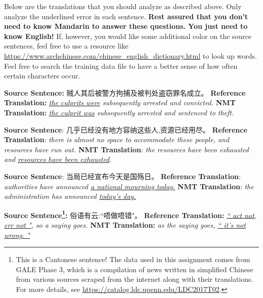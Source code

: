 \begin{parts}
    Below are the translations that you should analyze as described above. Only analyze the underlined error in each sentence. {\bf Rest assured that you don't need to know Mandarin to answer these questions. You just need to know English!} If, however, you would like some additional color on the source sentences, feel free to use a resource like \url{https://www.archchinese.com/chinese_english_dictionary.html} to look up words. Feel free to search the training data file to have a better sense of how often certain characters occur.

    \begin{subparts}
        \subpart[2]
        \textbf{Source Sentence:} 贼人其后被警方拘捕及被判处盗窃罪名成立。 \newline
        \textbf{Reference Translation:} \textit{\underline{the culprits were} subsequently arrested and convicted.}\newline
        \textbf{NMT Translation:} \textit{\underline{the culprit was} subsequently arrested and sentenced to theft.}
        
        \ifans{}


        \subpart[2]
        \textbf{Source Sentence}: 几乎已经没有地方容纳这些人,资源已经用尽。\newline
        \textbf{Reference Translation}: \textit{there is almost no space to accommodate these people, and resources have run out.   }\newline
        \textbf{NMT Translation}: \textit{the resources have been exhausted and \underline{resources have been exhausted}.}
        
        \ifans{}

        \subpart[2]
        \textbf{Source Sentence}: 当局已经宣布今天是国殇日。 \newline
        \textbf{Reference Translation}: \textit{authorities have announced \underline{a national mourning today.}}\newline
        \textbf{NMT Translation}: \textit{the administration has announced \underline{today's day.}}
        
        \ifans{}
        
        \subpart[2] 
        \textbf{Source Sentence\footnote{This is a Cantonese sentence! The data used in this assignment comes from GALE Phase 3, which is a compilation of news written in simplified Chinese from various sources scraped from the internet along with their translations. For more details, see \url{https://catalog.ldc.upenn.edu/LDC2017T02}. }:} 俗语有云:``唔做唔错"。\newline
        \textbf{Reference Translation:} \textit{\underline{`` act not, err not "}, so a saying goes.}\newline
        \textbf{NMT Translation:} \textit{as the saying goes, \underline{`` it's not wrong. "}}
        

\end{subparts}
\end{parts}
